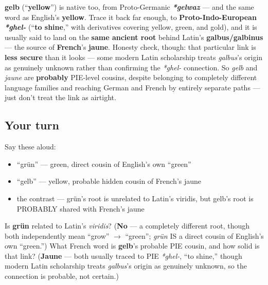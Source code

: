 \begin{cousinweb}
\textbf{gelb} (\textquotedblleft{}\textbf{yellow}\textquotedblright{}) is native too, from Proto-Germanic \emph{\textbf{*gelwaz}} — and the same word as English's \textbf{yellow}. Trace it back far enough, to \textbf{Proto-Indo-European} \emph{\textbf{*ghel-}} (\textquotedblleft{}\textbf{to shine},\textquotedblright{} with derivatives covering yellow, green, and gold), and it is usually said to land on the \textbf{same ancient root} behind Latin's \textbf{galbus/galbinus} — the source of \textbf{French}'s \textbf{jaune}. Honesty check, though: that particular link is \textbf{less secure} than it looks — some modern Latin scholarship treats \emph{galbus}'s origin as genuinely unknown rather than confirming the \emph{*ghel-} connection. So \emph{gelb} and \emph{jaune} are \textbf{probably} PIE-level cousins, despite belonging to completely different language families and reaching German and French by entirely separate paths — just don't treat the link as airtight.
\end{cousinweb}

\subsection*{Your turn}
Say these aloud:

\begin{itemize}
\raggedright
  \item \textquotedblleft{}grün\textquotedblright{} — green, direct cousin of English's own \textquotedblleft{}green\textquotedblright{}
  \item \textquotedblleft{}gelb\textquotedblright{} — yellow, probable hidden cousin of French's jaune
  \item the contrast — grün's root is unrelated to Latin's viridis, but gelb's root is PROBABLY shared with French's jaune
\end{itemize}

\begin{tcolorbox}[breakable,colback=teal!4,colframe=teal!35!black,title={Before you move on}]
Is \textbf{grün} related to Latin's \emph{viridis}? (\textbf{No} — a completely different root, though both independently mean \textquotedblleft{}grow\textquotedblright{} $\to$ \textquotedblleft{}green\textquotedblright{}; \emph{grün} IS a direct cousin of English's own \textquotedblleft{}green.\textquotedblright{}) What French word is \textbf{gelb}'s probable PIE cousin, and how solid is that link? (\textbf{Jaune} — both usually traced to PIE \emph{*ghel-}, \textquotedblleft{}to shine,\textquotedblright{} though modern Latin scholarship treats \emph{galbus}'s origin as genuinely unknown, so the connection is probable, not certain.)
\end{tcolorbox}
